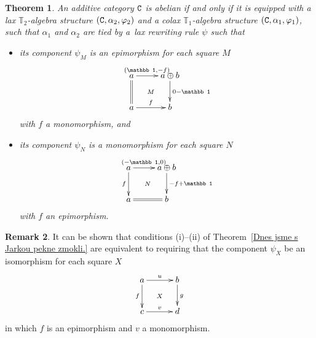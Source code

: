 \documentclass[12pt,leqno]{amsart}
\newtheorem{theorem}{Theorem}%
\theoremstyle{definition}
\newtheorem{remark}[theorem]{Remark}
\def\T{\mathbb{T}}
\def\id{{\mathbb 1}}
\newcommand{\C}{{\tt C}}
\newcommand{\eK}{\alpha_2}%
\newcommand{\eC}{\alpha_1}%
\newcommand{\4}{\texttt{4}}
\renewcommand{\phi}{\varphi}
\begin{document}
\begin{theorem}
\label{Dnes jsme s Jarkou pekne zmokli.}
An additive category $\C$ is abelian if and only if it is equipped with a
lax $\T_2$-algebra structure $(\C,\eK,\phi_2)$ and a colax
$\T_1$-algebra structure $(\C,\eC,\phi_1)$, such that $\alpha_1$ and
$\alpha_2$ are tied by a~lax rewriting rule $\psi$
such that 
\begin{itemize}[topsep=0pt, partopsep=0pt, itemsep=0pt, leftmargin=2em]
\item[(i)]
its component $\psi_M$ is an epimorphism for each square $M$
\[
\xymatrix@C=2.5em{
a \ar[r]^(.4){(\id,-f)} \ar@{=}[d] & a\oplus b \ar[d]^{0-\id}
\\
a \ar[r]^f & b \ar@{}[lu]|\hole|M
}
\]
with $f$ a monomorphism, and
\item[(ii)]
its component $\psi_N$ is a monomorphism for each square $N$
\[
\xymatrix@C=2.5em{
a \ar[r]^(.4){(-\id,0)} \ar[d]_f & a\oplus b \ar[d]^{-f+\id}
\\
a \ar@{=}[r]& b  \ar@{}[lu]|\hole|N
}
\]
with $f$ an epimorphism.
\end{itemize}
\end{theorem}

\begin{remark} 
It can be shown that conditions (i)--(ii) of Theorem~\ref{Dnes jsme s
  Jarkou pekne zmokli.}  are
equivalent to requiring that the component $\psi_X$ be an isomorphism
for each square $X$
\[
\xymatrix@C=3em{a \ar[r]^u \ar[d]_f  &b \ar[d]^g
\\
c \ar[r]^v&d  \ar@{}[lu]|\hole|X
}
\]
in which $f$ is an epimorphism and $v$ a monomorphism.
\end{remark}
\end{document}
